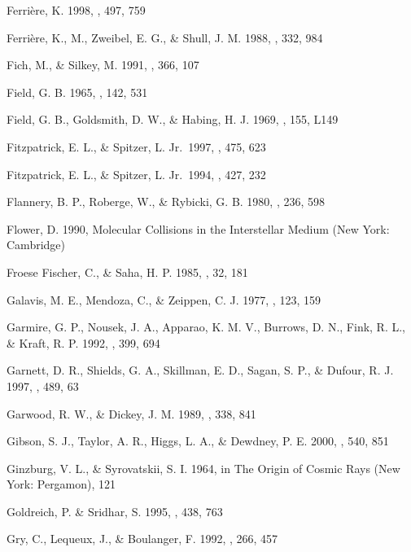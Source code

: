 \documentclass[12pt,preprint,flushrt]{aastex}
\begin{document}
\begin{thebibliography}{}
Ferri\`ere, K. 1998, \apj, 497, 759

Ferri\`ere, K., M., Zweibel, E. G., \& Shull,
J. M.  1988, \apj, 332, 984

Fich, M., \& Silkey, M. 1991, \apj, 366, 107

 Field, G. B. 1965, \apj, 142, 531

Field, G. B., Goldsmith, D. W., \& Habing, H. J. 1969, \apj, 155, L149

Fitzpatrick, E. L., \&
Spitzer, L. Jr.\ 1997, \apj, 475, 623

Fitzpatrick, E. L., \&
Spitzer, L. Jr.\ 1994, \apj, 427, 232

Flannery, B. P.,
Roberge, W., \& Rybicki, G. B. 1980, \apj, 236, 598

Flower, D. 1990, Molecular Collisions in
the Interstellar Medium (New York: Cambridge)

Froese Fischer, C., \& Saha, 
H. P. 1985, \physscr, 32, 181

Galavis, M. E., Mendoza,
C., \& Zeippen, C. J. 1977, \aaps, 123, 159

Garmire, G. P., Nousek, J. A., Apparao,
K. M. V., Burrows, D. N., Fink, R. L., \& Kraft, R. P. 1992, \apj, 399, 694

Garnett, D. R., Shields, G. A.,
Skillman, E. D., Sagan, S. P., \& Dufour, R. J. 1997, \apj, 489, 63

Garwood, R. W., \& Dickey, J. M. 1989,
\apj, 338, 841

Gibson, S. J., Taylor, A. R.,
Higgs, L. A., \& Dewdney, P. E. 2000, \apj, 540, 851 


Ginzburg, V. L., \& Syrovatskii, S. I. 1964, in
{The Origin of Cosmic Rays} (New York: Pergamon), 121 

Goldreich, P. \& Sridhar, S.
   1995, \apj, 438, 763

Gry, C., Lequeux, J., \&
      Boulanger, F. 1992, \aap, 266, 457


\end{thebibliography}
\end{document}
